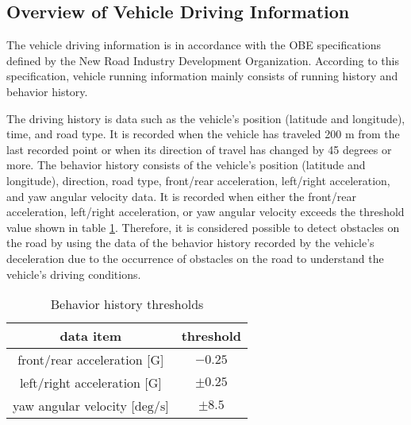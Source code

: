 \documentclass[paper]{ieice}
\begin{document}
\subsection{Overview of Vehicle Driving Information}
\label{sec:overview_of_vehicle_driving_information}
%
The vehicle driving information is in accordance with the OBE specifications defined by the New Road Industry Development Organization\cite{probdata_format}.
%
According to this specification, vehicle running information mainly consists of running history and behavior history.
%
\par
%
The driving history is data such as the vehicle's position (latitude and longitude), time, and road type.
%
It is recorded when the vehicle has traveled 200 m from the last recorded point or when its direction of travel has changed by 45 degrees or more.
%
The behavior history consists of the vehicle's position (latitude and longitude), direction, road type, front/rear acceleration, left/right acceleration, and yaw angular velocity data.
%
It is recorded when either the front/rear acceleration, left/right acceleration, or yaw angular velocity exceeds the threshold value shown in table \ref{tab:behavior_history_threshold}.
%
Therefore, it is considered possible to detect obstacles on the road by using the data of the behavior history recorded by the vehicle's deceleration due to the occurrence of obstacles on the road to understand the vehicle's driving conditions.
%
\begin{table}[tb]
  \caption{Behavior history thresholds}
  \label{tab:behavior_history_threshold}
  \begin{center}
  \begin{tabular}{c|c}
    data item & threshold                   \\ \hline \hline
    front/rear acceleration [$\mathrm{G}$] & $-0.25$      \\ \hline
    left/right acceleration [$\mathrm{G}$] & $\pm0.25$    \\ \hline
    yaw angular velocity [$\mathrm{deg/s}$]& $\pm8.5$ \\ \hline
\end{tabular}
\end{center}
\end{table}
\end{document}
